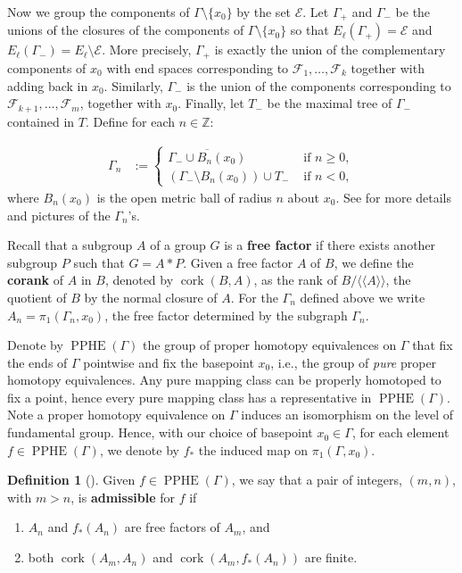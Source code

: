 \documentclass[11pt]{amsart}
\theoremstyle{plain}
\theoremstyle{definition}
\newtheorem{DEF}[THM]{Definition}
\DeclareMathOperator{\PPHE}{PPHE}
\DeclareMathOperator{\cork}{cork}
\newcommand{\Z}{\mathbb{Z}}
\newcommand{\cE}{\mathcal{E}}
\newcommand{\cF}{\mathcal{F}}
\def\G{{\Gamma}}
\newcommand{\defeq}{:=}
\newcommand{\<}{\langle}
\renewcommand{\>}{\rangle}
\begin{document}
Now we group the components of $\G \setminus \{x_{0}\}$ by the set $\cE$. Let $\G_{+}$ and $\G_{-}$ be the unions of the closures of the components of $\G \setminus \{x_{0}\}$ so that $E_{\ell}(\G_{+}) = \cE$ and $E_{\ell}(\G_{-}) = E_{\ell} \setminus \cE$. More precisely, $\G_{+}$ is exactly the union of the complementary components of $x_0$ with end spaces corresponding to $\cF_1,\ldots,\cF_k$ together with adding back in $x_{0}$. Similarly, $\G_{-}$ is the union of the components corresponding to $\cF_{k+1},\ldots, \cF_{m}$, together with $x_0$.
Finally, let $T_{-}$ be the maximal tree of $\Gamma_{-}$ contained in $T$. Define for each $n \in \Z$:

\begin{align*}
    \Gamma_{n} &\defeq \begin{cases} 
    \overline{\Gamma_{-} \cup B_{n}(x_{0})} &\text{ if }n \geq 0, \\
    \left(\Gamma_{-} \setminus B_{n}(x_{0})\right) \cup T_{-} &\text{ if }n < 0, 
    \end{cases}
\end{align*}
where $B_{n}(x_{0})$ is the open metric ball of radius $n$ about $x_{0}$. See \cite[Section 7.2]{DHK2023}
 for more details and pictures of the $\G_n$'s.

Recall that a subgroup $A$ of a group $G$ is a \textbf{free factor} if there exists another subgroup $P$ such that $G = A * P$. Given a free factor $A$ of $B$, we define the \textbf{corank} of $A$ in $B$, denoted by $\cork(B,A)$, as the rank of $B/\<\!\<A\>\!\>$, the quotient of $B$ by the normal closure of $A$. For the $\G_{n}$ defined above we write $A_{n} = \pi_{1}(\G_{n},x_{0})$, the free factor determined by the subgraph $\G_{n}$. 

Denote by $\PPHE(\G)$ the group of proper homotopy equivalences on $\G$ that fix the ends of $\G$ pointwise and fix the basepoint $x_{0}$, i.e., the group of \emph{pure} proper homotopy equivalences. Any pure mapping class can be properly homotoped to fix a point, hence every pure mapping class has a representative in $\PPHE(\G)$. Note a proper homotopy equivalence on $\G$ induces an isomorphism on the level of fundamental group. Hence, with our choice of basepoint $x_0 \in \G$, for each element $f \in \PPHE(\G)$, we denote by $f_*$ the induced map on $\pi_1(\G,x_0)$.

\begin{DEF}[{\cite[Definition 7.9]{DHK2023}}]
    Given $f \in \PPHE(\Gamma)$, we say that a pair of integers, $(m,n)$, with $m>n$, is \textbf{admissible} for $f$ if 
    \begin{enumerate}
        \item
            $A_{n}$ and $f_{*}(A_{n})$ are free factors of $A_{m}$, and
        \item
            both $\cork(A_{m},A_{n})$ and $\cork(A_{m},f_{*}(A_{n}))$ are finite.
    \end{enumerate}
\end{DEF}
\end{document}
